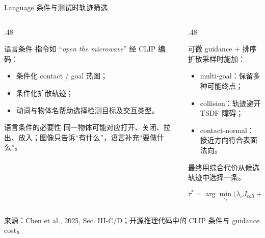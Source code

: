 \documentclass[aspectratio=169,10pt]{beamer}
\newcommand{\src}[1]{\vfill{\fontsize{5.8}{6.8}\selectfont\color{CUHKMidGray}来源：#1}}
\begin{document}
\begin{frame}{Language 条件与测试时轨迹筛选}
  \small
  \begin{columns}[T,onlytextwidth]
    \begin{column}{.48\textwidth}
      \begin{block}{语言条件}
        指令如 “\textit{open the microwave}” 经 CLIP 编码：
        \begin{itemize}
          \item 条件化 contact / goal 热图；
          \item 条件化扩散轨迹；
          \item 动词与物体名帮助选择检测目标及交互类型。
        \end{itemize}
      \end{block}
      \begin{alertblock}{语言条件的必要性}
        同一物体可能对应打开、关闭、拉出、放入；图像只告诉“有什么”，语言补充“要做什么”。
      \end{alertblock}
    \end{column}
    \begin{column}{.48\textwidth}
      \begin{block}{可微 guidance + 排序}
        扩散采样时施加：
        \begin{itemize}
          \item multi-goal：保留多种可能终点；
          \item collision：轨迹避开 TSDF 障碍；
          \item contact-normal：接近方向符合表面法向。
        \end{itemize}
        最终用综合代价从候选轨迹中选择一条。
      \end{block}
      \[
        \tau^*=\arg\min_{\tau_i}\bigl(\lambda_cJ_{coll}+\lambda_nJ_{normal}+\lambda_gJ_{goal}\bigr).
      \]
    \end{column}
  \end{columns}
  \src{Chen et al., 2025, Sec. III-C/D；开源推理代码中的 CLIP 条件与 guidance cost。}
\end{frame}
\end{document}
